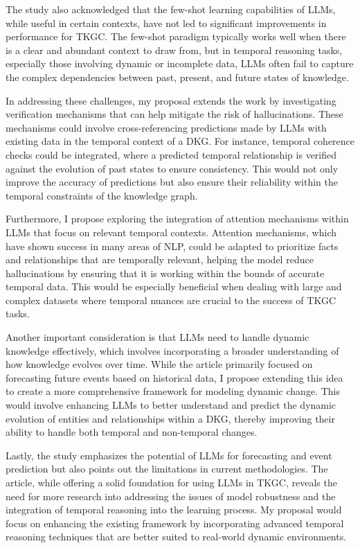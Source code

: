 The study also acknowledged that the few-shot learning capabilities of LLMs, while useful in certain contexts, have not led to significant improvements in performance for TKGC. The few-shot 
paradigm typically works well when there is a clear and abundant context to draw from, but in temporal reasoning tasks, especially those involving dynamic or incomplete data, LLMs often fail 
to capture the complex dependencies between past, present, and future states of knowledge.

In addressing these challenges, my proposal extends the work by investigating verification mechanisms that can help mitigate the risk of hallucinations. These mechanisms could involve 
cross-referencing predictions made by LLMs with existing data in the temporal context of a DKG. For instance, temporal coherence checks could be integrated, where a predicted temporal 
relationship is verified against the evolution of past states to ensure consistency. This would not only improve the accuracy of predictions but also ensure their reliability within the 
temporal constraints of the knowledge graph.

Furthermore, I propose exploring the integration of attention mechanisms within LLMs that focus on relevant temporal contexts. Attention mechanisms, which have shown success in many areas of 
NLP, could be adapted to prioritize facts and relationships that are temporally relevant, helping the model reduce hallucinations by ensuring that it is working within the bounds of accurate 
temporal data. This would be especially beneficial when dealing with large and complex datasets where temporal nuances are crucial to the success of TKGC tasks.

Another important consideration is that LLMs need to handle dynamic knowledge effectively, which involves incorporating a broader understanding of how knowledge evolves over time. While the 
article primarily focused on forecasting future events based on historical data, I propose extending this idea to create a more comprehensive framework for modeling dynamic change. This would 
involve enhancing LLMs to better understand and predict the dynamic evolution of entities and relationships within a DKG, thereby improving their ability to handle both temporal and 
non-temporal changes.

Lastly, the study emphasizes the potential of LLMs for forecasting and event prediction but also points out the limitations in current methodologies. The article, while offering a solid 
foundation for using LLMs in TKGC, reveals the need for more research into addressing the issues of model robustness and the integration of temporal reasoning into the learning process. 
My proposal would focus on enhancing the existing framework by incorporating advanced temporal reasoning techniques that are better suited to real-world dynamic environments.

